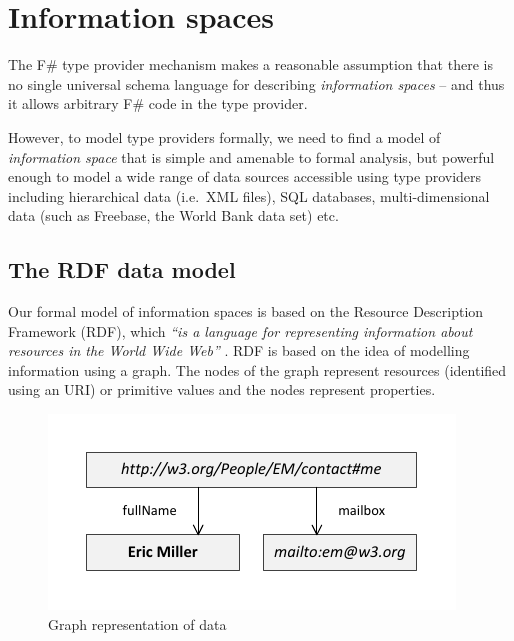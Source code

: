 \documentclass[10pt]{sigplanconf}
\begin{document}
\section{Information spaces}
The F\# type provider mechanism makes a reasonable assumption that there is no single universal
schema language for describing \emph{information spaces} -- and thus it allows arbitrary F\# code
in the type provider.

However, to model type providers formally, we need to find a model of \emph{information space} that 
is simple and amenable to formal analysis, but powerful enough to model a wide range of data
sources accessible using type providers including hierarchical data (i.e.\ XML files), SQL databases, 
multi-dimensional data (such as Freebase, the World Bank data set) etc. 

\subsection{The RDF data model}
Our formal model of information spaces is based on the Resource Description Framework (RDF), which 
\emph{``is a language for representing information about resources in the World Wide Web''} \cite{semweb-rdf}.
RDF is based on the idea of modelling information using a graph. The nodes of the graph represent
resources (identified using an URI) or primitive values and the nodes represent properties.

\begin{figure}
\begin{center}
\includegraphics[scale=1]{figs/rdf.pdf}
\end{center}
\vspace{-1.5em}
\caption{Graph representation of data}
\label{fig:rdf-example}
\end{figure}
\end{document}
